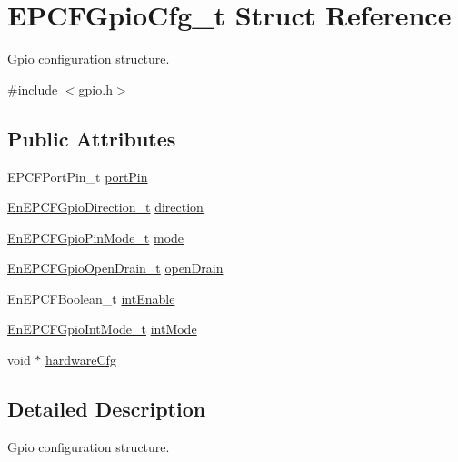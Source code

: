 \hypertarget{structEPCFGpioCfg__t}{}\section{E\+P\+C\+F\+Gpio\+Cfg\+\_\+t Struct Reference}
\label{structEPCFGpioCfg__t}


Gpio configuration structure.  




{\ttfamily \#include $<$gpio.\+h$>$}

\subsection*{Public Attributes}
\begin{DoxyCompactItemize}
\item 
E\+P\+C\+F\+Port\+Pin\+\_\+t \mbox{\hyperlink{structEPCFGpioCfg__t_aaf636f98b62ebee2dd106ac1a16b01d1}{port\+Pin}}
\item 
\mbox{\hyperlink{gpio_8h_acfac25969bd9ca852e4a8293fccf01b1}{En\+E\+P\+C\+F\+Gpio\+Direction\+\_\+t}} \mbox{\hyperlink{structEPCFGpioCfg__t_a74d5d67d533e9c0a1131fda88e22efe7}{direction}}
\item 
\mbox{\hyperlink{gpio_8h_afa0f233ad1316f898dabeb77efa64cd6}{En\+E\+P\+C\+F\+Gpio\+Pin\+Mode\+\_\+t}} \mbox{\hyperlink{structEPCFGpioCfg__t_a14e2373a72e518a95aaca60121a91e07}{mode}}
\item 
\mbox{\hyperlink{gpio_8h_a7b6f54f410f30de33a00d2a3124a7a01}{En\+E\+P\+C\+F\+Gpio\+Open\+Drain\+\_\+t}} \mbox{\hyperlink{structEPCFGpioCfg__t_a03d68acb4904365ac0125836b3969054}{open\+Drain}}
\item 
En\+E\+P\+C\+F\+Boolean\+\_\+t \mbox{\hyperlink{structEPCFGpioCfg__t_a3ea1b8cf99f36c3ff8312b22d0fa3266}{int\+Enable}}
\item 
\mbox{\hyperlink{gpio_8h_a8c60a8869509cbc9a1cf56ad8d8ae037}{En\+E\+P\+C\+F\+Gpio\+Int\+Mode\+\_\+t}} \mbox{\hyperlink{structEPCFGpioCfg__t_a2c37754fe090e872868d3dcf6e585561}{int\+Mode}}
\item 
void $\ast$ \mbox{\hyperlink{structEPCFGpioCfg__t_a8f6ac9e3b552904645605c80ce445e3f}{hardware\+Cfg}}
\end{DoxyCompactItemize}


\subsection{Detailed Description}
Gpio configuration structure. 

